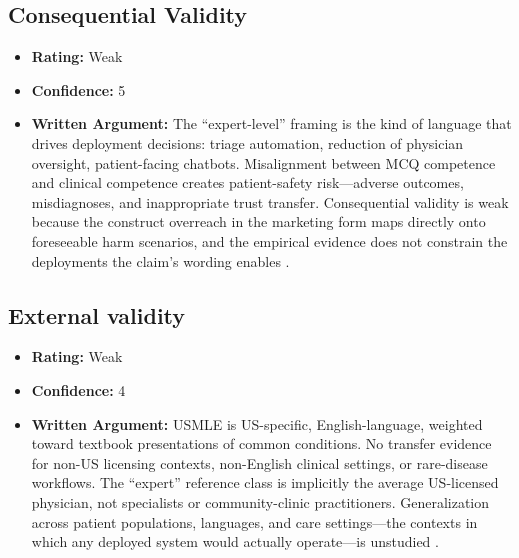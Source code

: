 \subsection{Consequential Validity}
\begin{itemize}
    \item \textbf{Rating:} Weak
    \item \textbf{Confidence:} 5
    \item \textbf{Written Argument:} The ``expert-level'' framing is the kind of language that drives deployment decisions: triage automation, reduction of physician oversight, patient-facing chatbots. Misalignment between MCQ competence and clinical competence creates patient-safety risk---adverse outcomes, misdiagnoses, and inappropriate trust transfer. Consequential validity is weak because the construct overreach in the marketing form maps directly onto foreseeable harm scenarios, and the empirical evidence does not constrain the deployments the claim's wording enables \citep{salaudeen2025measurement,alaa2025medical}.
\end{itemize}

\subsection{External validity}
\begin{itemize}
    \item \textbf{Rating:} Weak
    \item \textbf{Confidence:} 4
    \item \textbf{Written Argument:} USMLE is US-specific, English-language, weighted toward textbook presentations of common conditions. No transfer evidence for non-US licensing contexts, non-English clinical settings, or rare-disease workflows. The ``expert'' reference class is implicitly the average US-licensed physician, not specialists or community-clinic practitioners. Generalization across patient populations, languages, and care settings---the contexts in which any deployed system would actually operate---is unstudied \citep{salaudeen2025measurement}.
\end{itemize}

